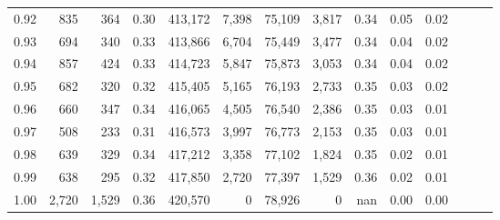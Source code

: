 \begin{tabular}{rrrrrrrrrrrrrr}
0.92 &    835 &    364 &  0.30 &  413,172 &    7,398 &  75,109 &   3,817 &  0.34 &  0.05 &      0.02 \\
0.93 &    694 &    340 &  0.33 &  413,866 &    6,704 &  75,449 &   3,477 &  0.34 &  0.04 &      0.02 \\
0.94 &    857 &    424 &  0.33 &  414,723 &    5,847 &  75,873 &   3,053 &  0.34 &  0.04 &      0.02 \\
0.95 &    682 &    320 &  0.32 &  415,405 &    5,165 &  76,193 &   2,733 &  0.35 &  0.03 &      0.02 \\
0.96 &    660 &    347 &  0.34 &  416,065 &    4,505 &  76,540 &   2,386 &  0.35 &  0.03 &      0.01 \\
0.97 &    508 &    233 &  0.31 &  416,573 &    3,997 &  76,773 &   2,153 &  0.35 &  0.03 &      0.01 \\
0.98 &    639 &    329 &  0.34 &  417,212 &    3,358 &  77,102 &   1,824 &  0.35 &  0.02 &      0.01 \\
0.99 &    638 &    295 &  0.32 &  417,850 &    2,720 &  77,397 &   1,529 &  0.36 &  0.02 &      0.01 \\
1.00 &  2,720 &  1,529 &  0.36 &  420,570 &        0 &  78,926 &       0 &   nan &  0.00 &      0.00 \\
\bottomrule
\end{tabular}
